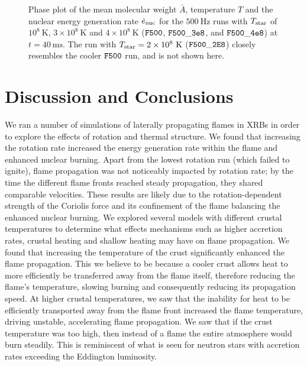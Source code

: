 \documentclass[preprint,times,tighten]{aastex63}
\begin{document}
\begin{figure}[t]
    \centering
    \caption{\label{fig:abar_hot}Phase plot of the mean molecular weight $\bar{A}$, temperature $T$ and the nuclear energy generation rate $\dot{e}_{\rm nuc}$ for the $500~\mathrm{Hz}$ runs with $T_{\rm star}$ of $10^8~\mathrm{K}$, $3\times10^8~\mathrm{K}$ and $4\times10^8~\mathrm{K}$ ($\tt{F500}$, $\tt{F500\_3e8}$, and $\tt{F500\_4e8}$) at $t = 40~\mathrm{ms}$. The run with $T_{\rm star} = 2\times10^8~\mathrm{K}$ ($\tt{F500\_2E8}$) closely resembles the cooler $\tt{F500}$ run, and is not shown here.}
\end{figure}

\section{Discussion and Conclusions}\label{Sec:conclusions}

We ran a number of simulations of laterally propagating flames in XRBs in order to explore the effects of rotation and thermal structure. We found that increasing the rotation rate increased the energy generation rate within the flame and enhanced nuclear burning. Apart from the lowest rotation run (which failed to ignite), flame propagation was not noticeably impacted by rotation rate; by the time the different flame fronts reached steady propagation, they shared comparable velocities. These results are likely due to the rotation-dependent strength of the Coriolis force and its confinement of the flame balancing the enhanced nuclear burning. We explored several models with different crustal temperatures to determine what effects mechanisms such as higher accretion rates, crustal heating and shallow heating may have on flame propagation. We found that increasing the temperature of the crust significantly enhanced the flame propagation. This we believe to be because a cooler crust allows heat to more efficiently be transferred away from the flame itself, therefore reducing the flame's temperature, slowing burning and consequently reducing its propagation speed. At higher crustal temperatures, we saw that the inability for heat to be efficiently transported away from the flame front increased the flame temperature, driving unstable, accelerating flame propagation. We saw that if the crust temperature was too high, then instead of a flame the entire atmosphere would burn steadily. This is reminiscent of what is seen for neutron stars with accretion rates exceeding the Eddington luminosity.
\end{document}
